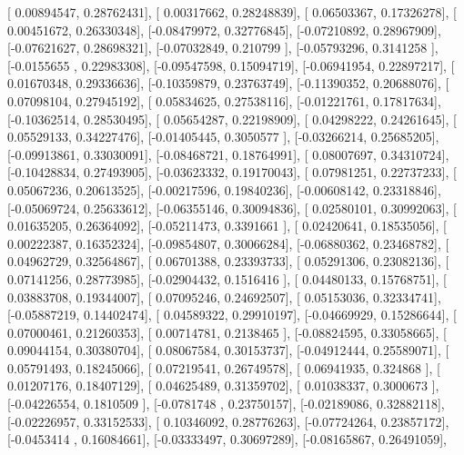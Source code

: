 \documentclass{article}
\begin{document}
       [ 0.00894547,  0.28762431],
       [ 0.00317662,  0.28248839],
       [ 0.06503367,  0.17326278],
       [ 0.00451672,  0.26330348],
       [-0.08479972,  0.32776845],
       [-0.07210892,  0.28967909],
       [-0.07621627,  0.28698321],
       [-0.07032849,  0.210799  ],
       [-0.05793296,  0.3141258 ],
       [-0.0155655 ,  0.22983308],
       [-0.09547598,  0.15094719],
       [-0.06941954,  0.22897217],
       [ 0.01670348,  0.29336636],
       [-0.10359879,  0.23763749],
       [-0.11390352,  0.20688076],
       [ 0.07098104,  0.27945192],
       [ 0.05834625,  0.27538116],
       [-0.01221761,  0.17817634],
       [-0.10362514,  0.28530495],
       [ 0.05654287,  0.22198909],
       [ 0.04298222,  0.24261645],
       [ 0.05529133,  0.34227476],
       [-0.01405445,  0.3050577 ],
       [-0.03266214,  0.25685205],
       [-0.09913861,  0.33030091],
       [-0.08468721,  0.18764991],
       [ 0.08007697,  0.34310724],
       [-0.10428834,  0.27493905],
       [-0.03623332,  0.19170043],
       [ 0.07981251,  0.22737233],
       [ 0.05067236,  0.20613525],
       [-0.00217596,  0.19840236],
       [-0.00608142,  0.23318846],
       [-0.05069724,  0.25633612],
       [-0.06355146,  0.30094836],
       [ 0.02580101,  0.30992063],
       [ 0.01635205,  0.26364092],
       [-0.05211473,  0.3391661 ],
       [ 0.02420641,  0.18535056],
       [ 0.00222387,  0.16352324],
       [-0.09854807,  0.30066284],
       [-0.06880362,  0.23468782],
       [ 0.04962729,  0.32564867],
       [ 0.06701388,  0.23393733],
       [ 0.05291306,  0.23082136],
       [ 0.07141256,  0.28773985],
       [-0.02904432,  0.1516416 ],
       [ 0.04480133,  0.15768751],
       [ 0.03883708,  0.19344007],
       [ 0.07095246,  0.24692507],
       [ 0.05153036,  0.32334741],
       [-0.05887219,  0.14402474],
       [ 0.04589322,  0.29910197],
       [-0.04669929,  0.15286644],
       [ 0.07000461,  0.21260353],
       [ 0.00714781,  0.2138465 ],
       [-0.08824595,  0.33058665],
       [ 0.09044154,  0.30380704],
       [ 0.08067584,  0.30153737],
       [-0.04912444,  0.25589071],
       [ 0.05791493,  0.18245066],
       [ 0.07219541,  0.26749578],
       [ 0.06941935,  0.324868  ],
       [ 0.01207176,  0.18407129],
       [ 0.04625489,  0.31359702],
       [ 0.01038337,  0.3000673 ],
       [-0.04226554,  0.1810509 ],
       [-0.0781748 ,  0.23750157],
       [-0.02189086,  0.32882118],
       [-0.02226957,  0.33152533],
       [ 0.10346092,  0.28776263],
       [-0.07724264,  0.23857172],
       [-0.0453414 ,  0.16084661],
       [-0.03333497,  0.30697289],
       [-0.08165867,  0.26491059],
\end{document}
